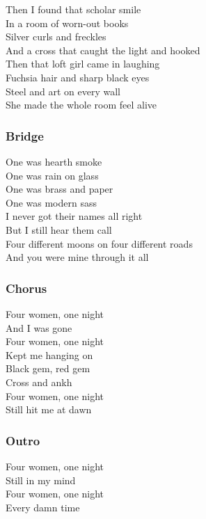 Then I found that scholar smile\\
In a room of worn-out books\\
Silver curls and freckles\\
And a cross that caught the light and hooked\\
Then that loft girl came in laughing\\
Fuchsia hair and sharp black eyes\\
Steel and art on every wall\\
She made the whole room feel alive

\subsubsection{Bridge}\label{bridge-2}

One was hearth smoke\\
One was rain on glass\\
One was brass and paper\\
One was modern sass\\
I never got their names all right\\
But I still hear them call\\
Four different moons on four different roads\\
And you were mine through it all

\subsubsection{Chorus}\label{chorus-9}

Four women, one night\\
And I was gone\\
Four women, one night\\
Kept me hanging on\\
Black gem, red gem\\
Cross and ankh\\
Four women, one night\\
Still hit me at dawn

\subsubsection{Outro}\label{outro}

Four women, one night\\
Still in my mind\\
Four women, one night\\
Every damn time

